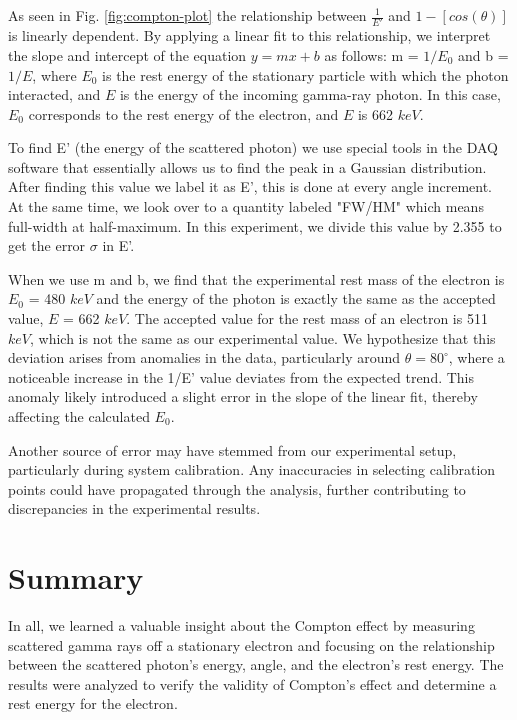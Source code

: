 \documentclass[a4paper,12pt,english]{all-in-one} %
\begin{document}
\begin{multicols}{2}
{As seen in Fig. \ref{fig:compton-plot} the relationship between $\frac{1}{E'}$ and $1-[cos(\theta)]$ is linearly dependent. By applying a linear fit to this relationship, we interpret the slope and intercept of the equation $y=mx+b$ as follows: m = $1/E_0$ and b = $1/E$, where $E_0$ is the rest energy of the stationary particle with which the photon interacted, and $E$ is the energy of the incoming gamma-ray photon. In this case, $E_0$ corresponds to the rest energy of the electron, and $E$ is 662 $keV$.

To find E' (the energy of the scattered photon) we use special tools in the DAQ software that essentially allows us to find the peak in a Gaussian distribution. After finding this value we label it as E', this is done at every angle increment. At the same time, we look over to a quantity labeled "FW/HM" which means full-width at half-maximum. In this experiment, we divide this value by 2.355 to get the error $\sigma$ in E'.

When we use m and b, we find that the experimental rest mass of the electron is $E_0$ = 480 $keV$ and the energy of the photon is exactly the same as the accepted value, $E$ = 662 $keV$. The accepted value for the rest mass of an electron is 511 $keV$, which is not the same as our experimental value. We hypothesize that this deviation arises from anomalies in the data, particularly around $\theta = 80^{\circ}$, where a noticeable increase in the 1/E' value deviates from the expected trend. This anomaly likely introduced a slight error in the slope of the linear fit, thereby affecting the calculated $E_0$.

Another source of error may have stemmed from our experimental setup, particularly during system calibration. Any inaccuracies in selecting calibration points could have propagated through the analysis, further contributing to discrepancies in the experimental results.

}
\end{multicols}

\section*{Summary}
{
 In all, we learned a valuable insight about the Compton effect by measuring scattered gamma rays off a stationary electron and focusing on the relationship between the scattered photon’s energy, angle, and the electron’s rest energy. The results were analyzed to verify the validity of Compton's effect and determine a rest energy for the electron.
}
\end{document}
